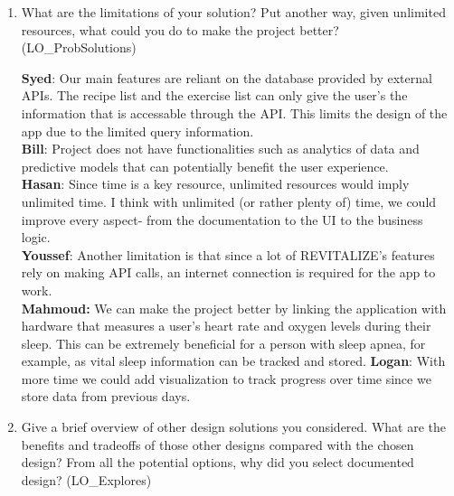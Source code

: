 \documentclass[12pt, titlepage]{article}
\begin{document}
\begin{enumerate}
	\item What are the limitations of your solution?  Put another way, given
	unlimited resources, what could you do to make the project better? (LO\_ProbSolutions)
	
	\textbf{Syed}: Our main features are reliant on the database provided by external APIs. The recipe list and the exercise list can only give the user's the information that is accessable through the API. This limits the design of the app due to the limited query information. \\
	\textbf{Bill}: Project does not have functionalities such as analytics of data and predictive models that can potentially benefit the user experience. \\
	\textbf{Hasan}: Since time is a key resource, unlimited resources would imply unlimited time. I think with unlimited (or rather plenty of) time, we could improve every aspect- from the documentation to the UI to the business logic. \\
	\textbf{Youssef}: Another limitation is that since a lot of REVITALIZE's features rely on making API calls, an internet connection is required for the app to work. \\
	\textbf{Mahmoud:} We can make the project better by linking the application with hardware that measures a user's heart rate and oxygen levels during their sleep. This can be extremely beneficial for a person with sleep apnea, for example, as vital sleep information can be tracked and stored.
    \textbf{Logan}: With more time we could add visualization to track progress over time since we store data from previous days.	
	
	
	\item Give a brief overview of other design solutions you considered.  What
	are the benefits and tradeoffs of those other designs compared with the chosen
	design?  From all the potential options, why did you select documented design?
	(LO\_Explores)
	

\end{enumerate}
\end{document}
